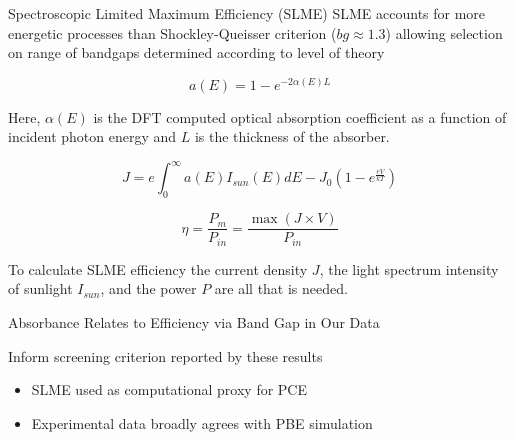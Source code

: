 \documentclass[10pt, aspectratio=169, presentation]{beamer}
\begin{document}
\begin{frame}[label={sec:org4e1033f}]{Spectroscopic Limited Maximum Efficiency (SLME)}
SLME accounts for more energetic processes than Shockley-Queisser
criterion (\(bg \approx 1.3\)) allowing selection on range of bandgaps
determined according to level of theory\autocite[p.1]{yu-2012-ident-poten}

\[
a(E)=1-e^{-2\alpha(E)L}
\]

Here, \(\alpha(E)\) is the DFT computed optical absorption coefficient
as a function of incident photon energy and \(L\) is the thickness of
the absorber.

\[
J=e\int_{0}^{\infty} a(E)I_{sun}(E)dE - J_{0}(1-e^{\frac{eV}{kT}})
\]

\[
\eta = \frac{P_{m}}{P_{in}}=\frac{\max(J \times V)}{P_{in}}
\]

To calculate SLME efficiency the current density \(J\), the light
spectrum intensity of sunlight \(I_{sun}\), and the power \(P\) are
all that is needed.
\end{frame}

\begin{frame}[label={sec:org45dd923}]{Absorbance Relates to Efficiency via Band Gap in Our Data}
 
\begin{center}

\end{center}

Inform screening criterion reported by these results\autocite{yang-2023-high-throug} 
\begin{itemize}
\item SLME used as computational proxy for PCE
\item Experimental data\autocite{almora-2020-devic-perfor} broadly agrees with PBE simulation
\end{itemize}
\end{frame}
\end{document}
